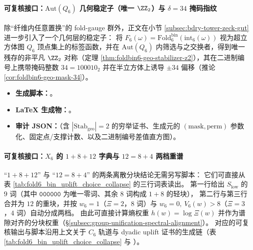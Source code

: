 \paragraph{可复核接口：\texorpdfstring{$\mathrm{Aut}(Q_6)$}{Aut(Q6)} 几何稳定子（唯一 \texorpdfstring{$\ZZ_2$}{Z2}）与 \texorpdfstring{$\delta=34$}{δ=34} 掩码指纹}
除“纤维内任意置换”的 fold-gauge 群外，正文在小节 \ref{subsec:bdry-tower-zeck-gut} 进一步引入了一个几何层的稳定子：
将 \(F_6(\omega)=\mathrm{Fold}^{\mathrm{bin}}_6(\mathrm{int}_6(\omega))\) 视为超立方体图 \(Q_6\) 顶点集上的标签函数，并在 \(\mathrm{Aut}(Q_6)\) 内筛选与之交换者，得到唯一残存的非平凡 \(\ZZ_2\) 对称（定理 \ref{thm:foldbin6-geo-stabilizer-z2}），其在二进制编号上携带掩码整数 \(34=100010_2\) 并在半立方体上诱导 \(\pm 34\) 偏移（推论 \ref{cor:foldbin6-geo-mask-34}）。
\begin{itemize}
  \item \textbf{生成脚本：}\texttt{}。
  \item \textbf{LaTeX 生成物：}\texttt{}。
  \item \textbf{审计 JSON：}\texttt{}（含 \(|\mathrm{Stab}_{\mathrm{geo}}|=2\) 的穷举证书、生成元的 \((\mathrm{mask},\mathrm{perm})\) 参数化、固定点/支撑计数、以及二进制编号差值直方图）。
\end{itemize}

\paragraph{可复核接口：\texorpdfstring{$X_6$}{X6} 的 \(1+8+12\) 字典与 \(12=8+4\) 两档重谱}
“\(1+8+12\)” 与 “\(12=8+4\)” 的两条离散分块结论无需另写脚本：
它们可直接从表 \ref{tab:fold6_bin_uplift_choice_collapse} 的三行词表读出。
第一行给出 \(S_{\mathrm{low}}\) 的 \(9\) 词（其中 \(\texttt{000000}\) 为唯一零词、其余 \(8\) 词构成 \(1+8\) 的轻块），
第二行与第三行合并为 \(12\) 的重块，并按 \(w_6=1\)（\(\Xi=2\)，\(8\) 词）与 \(w_6=0,\ V_6(w)>8\)（\(\Xi=3\)，\(4\) 词）自动分成两档。
由此可直接计算熵权重 \(h(w)=\log\Xi(w)\) 并作为谱隙对齐的分块权重（\S\ref{subsec:group-unification-spectral-alignment}）。
对应的可复核输出与脚本沿用上文关于 \(C_6\) 轨道与 dyadic uplift 证书的生成链（表 \ref{tab:fold6_bin_uplift_choice_collapse} 与
\texttt{}）。

